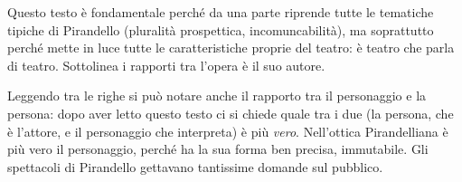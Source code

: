 \documentclass[a4paper, twoside, titlepage]{book}
\begin{document}
Questo testo è fondamentale perché da una parte riprende tutte le tematiche tipiche di Pirandello (pluralità prospettica, incomuncabilità), ma soprattutto perché mette in luce tutte le caratteristiche proprie del teatro: è teatro che parla di teatro. Sottolinea i rapporti tra l’opera è il suo autore.

Leggendo tra le righe si può notare anche il rapporto tra il personaggio e la persona: dopo aver letto questo testo ci si chiede quale tra i due (la persona, che è l’attore, e il personaggio che interpreta) è più \textit{vero}.
Nell’ottica Pirandelliana è più vero il personaggio, perché ha la sua forma ben precisa, immutabile.
Gli spettacoli di Pirandello gettavano tantissime domande sul pubblico.






\end{document}
